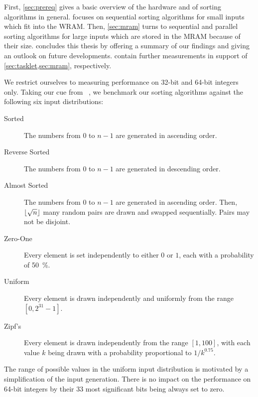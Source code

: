 First, \cref{sec:prereq} gives a basic overview of the \upmem{} hardware and of sorting algorithms in general.
 focuses on sequential sorting algorithms for small inputs which fit into the \acs*{WRAM}.
Then, \cref{sec:mram} turns to sequential and parallel sorting algorithms for large inputs which are stored in the \acs*{MRAM} because of their size.
 concludes this thesis by offering a summary of our findings and giving an outlook on future developments.
 contain further measurements in support of \cref{sec:tasklet,sec:mram}, respectively.

We restrict ourselves to measuring performance on 32-bit and 64-bit integers only.
Taking our cue from \citeauthor{axtmann2020engineering}~\cite{axtmann2020engineering}, we benchmark our sorting algorithms against the following six input distributions:
\begin{description}
	\item[Sorted]
	The numbers from \(0\) to \(n - 1\) are generated in ascending order.

	\item[Reverse Sorted]
	The numbers from \(0\) to \(n - 1\) are generated in descending order.

	\item[Almost Sorted]
	The numbers from \(0\) to \(n - 1\) are generated in ascending order.
	Then, \(\lfloor\sqrt{n}\rfloor\) many random pairs are drawn and swapped sequentially.
	Pairs may not be disjoint.

	\item[Zero-One]
	Every element is set independently to either \(0\) or \(1\), each with a probability of \qty{50}{\percent}.

	\item[Uniform]
	Every element is drawn independently and uniformly from the range \([0, 2^{31} - 1]\).

	\item[Zipf's]
	Every element is drawn independently from the range \([1, 100]\), with each value \(k\) being drawn with a probability proportional to \(1/k^{0.75}\).
\end{description}
The range of possible values in the uniform input distribution is motivated by a simplification of the input generation.
There is no impact on the performance on 64-bit integers by their 33 most significant bits being always set to zero.
